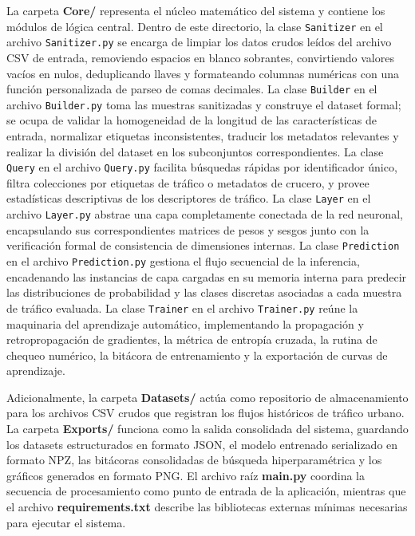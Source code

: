 \documentclass[11pt,a4paper]{article}
\begin{document}
La carpeta \textbf{Core/} representa el núcleo matemático del sistema y contiene los módulos de lógica central. Dentro de este directorio, la clase \texttt{Sanitizer} en el archivo \texttt{Sanitizer.py} se encarga de limpiar los datos crudos leídos del archivo CSV de entrada, removiendo espacios en blanco sobrantes, convirtiendo valores vacíos en nulos, deduplicando llaves y formateando columnas numéricas con una función personalizada de parseo de comas decimales. 
La clase \texttt{Builder} en el archivo \texttt{Builder.py} toma las muestras sanitizadas y construye el dataset formal; se ocupa de validar la homogeneidad de la longitud de las características de entrada, normalizar etiquetas inconsistentes, traducir los metadatos relevantes y realizar la división del dataset en los subconjuntos correspondientes.
La clase \texttt{Query} en el archivo \texttt{Query.py} facilita búsquedas rápidas por identificador único, filtra colecciones por etiquetas de tráfico o metadatos de crucero, y provee estadísticas descriptivas de los descriptores de tráfico.
La clase \texttt{Layer} en el archivo \texttt{Layer.py} abstrae una capa completamente conectada de la red neuronal, encapsulando sus correspondientes matrices de pesos y sesgos junto con la verificación formal de consistencia de dimensiones internas.
La clase \texttt{Prediction} en el archivo \texttt{Prediction.py} gestiona el flujo secuencial de la inferencia, encadenando las instancias de capa cargadas en su memoria interna para predecir las distribuciones de probabilidad y las clases discretas asociadas a cada muestra de tráfico evaluada.
La clase \texttt{Trainer} en el archivo \texttt{Trainer.py} reúne la maquinaria del aprendizaje automático, implementando la propagación y retropropagación de gradientes, la métrica de entropía cruzada, la rutina de chequeo numérico, la bitácora de entrenamiento y la exportación de curvas de aprendizaje.

Adicionalmente, la carpeta \textbf{Datasets/} actúa como repositorio de almacenamiento para los archivos CSV crudos que registran los flujos históricos de tráfico urbano. La carpeta \textbf{Exports/} funciona como la salida consolidada del sistema, guardando los datasets estructurados en formato JSON, el modelo entrenado serializado en formato NPZ, las bitácoras consolidadas de búsqueda hiperparamétrica y los gráficos generados en formato PNG. El archivo raíz \textbf{main.py} coordina la secuencia de procesamiento como punto de entrada de la aplicación, mientras que el archivo \textbf{requirements.txt} describe las bibliotecas externas mínimas necesarias para ejecutar el sistema.
\end{document}
